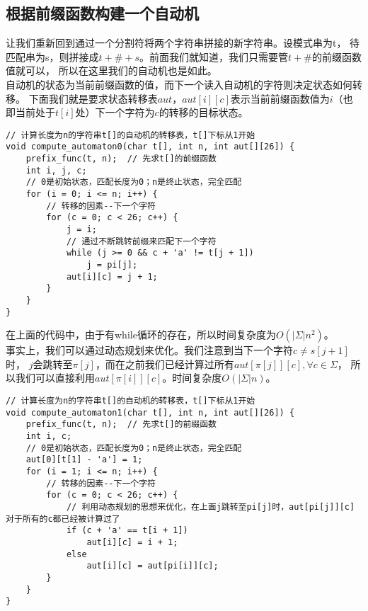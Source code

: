     \subsection{根据前缀函数构建一个自动机}
        让我们重新回到通过一个分割符将两个字符串拼接的新字符串。设模式串为t，
        待匹配串为s，则拼接成$t+\#+s$。前面我们就知道，我们只需要管$t+\#$的前缀函数值就可以，
        所以在这里我们的自动机也是如此。\\
        自动机的状态为当前前缀函数的值，而下一个读入自动机的字符则决定状态如何转移。
        下面我们就是要求状态转移表$aut$，$aut[i][c]$表示当前前缀函数值为$i$（也
        即当前处于$t[i]$处）下一个字符为$c$的转移的目标状态。
        \begin{lstlisting}
// 计算长度为n的字符串t[]的自动机的转移表，t[]下标从1开始
void compute_automaton0(char t[], int n, int aut[][26]) {
    prefix_func(t, n);  // 先求t[]的前缀函数
    int i, j, c;
    // 0是初始状态，匹配长度为0；n是终止状态，完全匹配
    for (i = 0; i <= n; i++) {
        // 转移的因素--下一个字符
        for (c = 0; c < 26; c++) {
            j = i;
            // 通过不断跳转前缀来匹配下一个字符
            while (j >= 0 && c + 'a' != t[j + 1])
                j = pi[j];
            aut[i][c] = j + 1;
        }
    }
}
        \end{lstlisting}
        在上面的代码中，由于有while循环的存在，所以时间复杂度为$O(|\Sigma|n^2)$。\\
        事实上，我们可以通过动态规划来优化。我们注意到当下一个字符$c \neq s[j+1]$时，
        $j$会跳转至$\pi[j]$，而在之前我们已经计算过所有$aut[\pi[j]][c],\forall c \in \Sigma$，
        所以我们可以直接利用$aut[\pi[i]][c]$。时间复杂度$O(|\Sigma|n)$。
        \begin{lstlisting}
// 计算长度为n的字符串t[]的自动机的转移表，t[]下标从1开始
void compute_automaton1(char t[], int n, int aut[][26]) {
    prefix_func(t, n);  // 先求t[]的前缀函数
    int i, c;
    // 0是初始状态，匹配长度为0；n是终止状态，完全匹配
    aut[0][t[1] - 'a'] = 1;
    for (i = 1; i <= n; i++) {
        // 转移的因素--下一个字符
        for (c = 0; c < 26; c++) {
            // 利用动态规划的思想来优化，在上面j跳转至pi[j]时，aut[pi[j]][c]对于所有的c都已经被计算过了
            if (c + 'a' == t[i + 1])
                aut[i][c] = i + 1;
            else
                aut[i][c] = aut[pi[i]][c];
        }
    }
}
        \end{lstlisting}
